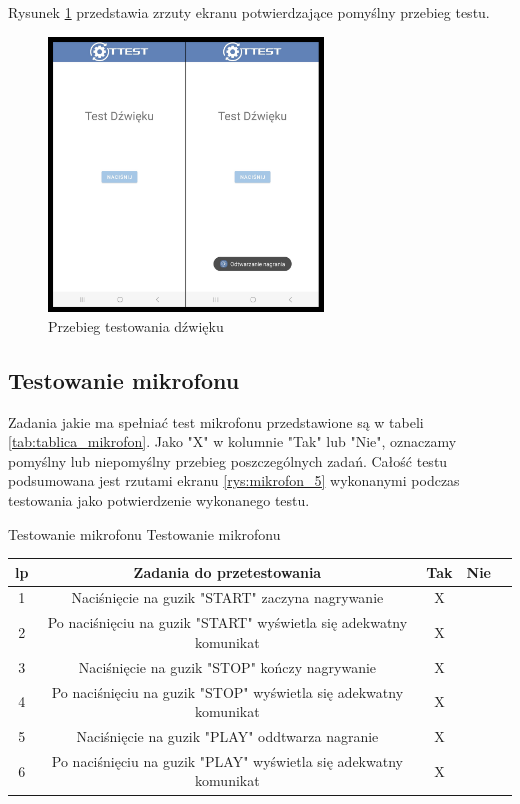 Rysunek \ref{rys:dzwiek} przedstawia zrzuty ekranu potwierdzające pomyślny przebieg testu.

\begin{figure}[!hbt]
	\begin{center}
		\includegraphics[angle=360, width=0.65\textwidth]{rys/punkt5/dzwiek.png}
		\caption{Przebieg testowania dźwięku}
		\label{rys:dzwiek}
	\end{center}
\end{figure} 

\newpage


\subsection{Testowanie mikrofonu}

\hspace{0.60cm}Zadania jakie ma spełniać test mikrofonu przedstawione są w tabeli \ref{tab:tablica_mikrofon}. Jako "X" w kolumnie "Tak" lub "Nie", oznaczamy pomyślny lub niepomyślny przebieg poszczególnych zadań. Całość testu podsumowana jest rzutami ekranu \ref{rys:mikrofon_5} wykonanymi podczas testowania jako potwierdzenie wykonanego testu.

\begin{tabela}
	{Testowanie mikrofonu}	%
	{Testowanie mikrofonu}	%
	{
		\begin{tabular}{|c|c|c|c|c|} \hline
			\textbf{lp} & \textbf{Zadania do przetestowania} & \textbf{Tak} & \textbf{Nie} \\ \hline
			1 & Naciśnięcie na guzik "START" zaczyna nagrywanie & X & ~ \\ \hline
			2 & Po naciśnięciu na guzik "START" wyświetla się adekwatny komunikat & X & ~ \\ \hline
			3 & Naciśnięcie na guzik "STOP" kończy nagrywanie & X & ~ \\ \hline
			4 & Po naciśnięciu na guzik "STOP" wyświetla się adekwatny komunikat & X & ~ \\ \hline
			5 & Naciśnięcie na guzik "PLAY" oddtwarza nagranie & X & ~ \\ \hline
			6 &  Po naciśnięciu na guzik "PLAY" wyświetla się adekwatny komunikat & X & ~ \\ \hline
	\end{tabular}	}
	\label{tab:tablica_mikrofon}
\end{tabela}

